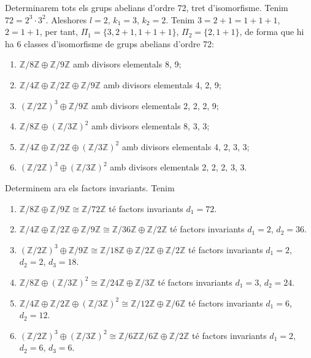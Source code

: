 \documentclass[../main.tex]{subfiles}
\begin{document}
\begin{ej}
Determinarem tots els grups abelians d'ordre 72, tret d'isomorfisme. Tenim $72 = 2^3\cdotp 3^2$. Aleshores $l = 2$, $k_1 = 3$, $k_2=2$. Tenim $3 = 2+1 = 1+1+1$, $2 = 1+1$, per tant, $\Pi_1 = \{3,2+1,1+1+1\}$, $\Pi_2 = \{2,1+1\}$, de forma que hi ha 6 classes d'isomorfisme de grups abelians d'ordre 72:
\begin{enumerate}[1)]
    \item $\mathbb{Z}/8\mathbb{Z}\oplus\mathbb{Z}/9\mathbb{Z}$ amb divisors elementals 8, 9;
    \item $\mathbb{Z}/4\mathbb{Z}\oplus\mathbb{Z}/2\mathbb{Z}\oplus\mathbb{Z}/9\mathbb{Z}$ amb divisors elementals 4, 2, 9;
    \item $(\mathbb{Z}/2\mathbb{Z})^3\oplus \mathbb{Z}/9\mathbb{Z}$ amb divisors elementals 2, 2, 2, 9;
    \item $\mathbb{Z}/8\mathbb{Z}\oplus (\mathbb{Z}/3\mathbb{Z})^2$ amb divisors elementals 8, 3, 3;
    \item $\mathbb{Z}/4\mathbb{Z}\oplus\mathbb{Z}/2\mathbb{Z}\oplus(\mathbb{Z}/3\mathbb{Z})^2$ amb divisors elementals 4, 2, 3, 3;
    \item $(\mathbb{Z}/2\mathbb{Z})^3\oplus(\mathbb{Z}/3\mathbb{Z})^2$ amb divisors elementals 2, 2, 2, 3, 3.
\end{enumerate}

Determinem ara els factors invariants. Tenim
\begin{enumerate}[1)]
    \item $\mathbb{Z}/8\mathbb{Z}\oplus\mathbb{Z}/9\mathbb{Z}\cong \mathbb{Z}/72\mathbb{Z}$ té factors invariants $d_1 = 72$.
    \item $\mathbb{Z}/4\mathbb{Z}\oplus\mathbb{Z}/2\mathbb{Z}\oplus\mathbb{Z}/9\mathbb{Z}\cong \mathbb{Z}/36\mathbb{Z}\oplus\mathbb{Z}/2\mathbb{Z}$ té factors invariants $d_1 = 2$, $d_2 = 36$.
    \item $(\mathbb{Z}/2\mathbb{Z})^3\oplus \mathbb{Z}/9\mathbb{Z}\cong \mathbb{Z}/18\mathbb{Z}\oplus\mathbb{Z}/2\mathbb{Z}\oplus\mathbb{Z}/2\mathbb{Z}$ té factors invariants $d_1 = 2$, $d_2 = 2$, $d_3 = 18$.
    \item $\mathbb{Z}/8\mathbb{Z}\oplus (\mathbb{Z}/3\mathbb{Z})^2\cong \mathbb{Z}/24\mathbb{Z}\oplus \mathbb{Z}/3\mathbb{Z}$ té factors invariants $d_1 = 3$, $d_2 = 24$.
    \item $\mathbb{Z}/4\mathbb{Z}\oplus\mathbb{Z}/2\mathbb{Z}\oplus(\mathbb{Z}/3\mathbb{Z})^2\cong \mathbb{Z}/12\mathbb{Z}\oplus\mathbb{Z}/6\mathbb{Z}$ té factors invariants $d_1 = 6$, $d_2 = 12$.
    \item $(\mathbb{Z}/2\mathbb{Z})^3\oplus(\mathbb{Z}/3\mathbb{Z})^2 \cong \mathbb{Z}/6\mathbb{Z}\mathbb{Z}/6\mathbb{Z}\oplus\mathbb{Z}/2\mathbb{Z}$ té factors invariants $d_1 = 2$, $d_2 = 6$, $d_3 = 6$.
\end{enumerate}
\end{ej}
\end{document}
